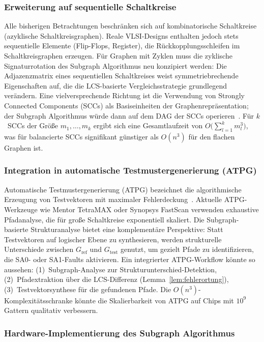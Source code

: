 ﻿\documentclass[a4paper,12pt]{article}
\theoremstyle{definition}
\begin{document}
\subsubsection{Erweiterung auf sequentielle Schaltkreise}

Alle bisherigen Betrachtungen beschränken sich auf kombinatorische
Schaltkreise (azyklische Schaltkreisgraphen). Reale VLSI-Designs
enthalten jedoch stets sequentielle Elemente (Flip-Flops, Register),
die Rückkopplungsschleifen im Schaltkreisgraphen erzeugen. Für
Graphen mit Zyklen muss die zyklische Signaturrotation des Subgraph
Algorithmus neu konzipiert werden: Die Adjazenzmatrix eines
sequentiellen Schaltkreises weist symmetriebrechende Eigenschaften
auf, die die LCS-basierte Vergleichsstrategie grundlegend verändern.
Eine vielversprechende Richtung ist die Verwendung von Strongly
Connected Components (SCCs) als Basiseinheiten der
Graphenrepräsentation; der Subgraph Algorithmus würde dann auf dem
DAG der SCCs operieren~\cite{cormen2009introduction}. Für $k$~SCCs
der Größe $m_1, \ldots, m_k$ ergibt sich eine Gesamtlaufzeit von
$O\!\bigl(\sum_{l=1}^k m_l^3\bigr)$, was für balancierte SCCs
signifikant günstiger als $O(n^3)$ für den flachen Graphen ist.

\subsubsection{Integration in automatische Testmustergenerierung (ATPG)}

Automatische Testmustergenerierung (ATPG) bezeichnet die
algorithmische Erzeugung von Testvektoren mit maximaler
Fehlerdeckung~\cite{bushnell2000essentials}. Aktuelle ATPG-Werkzeuge
wie Mentor TetraMAX oder Synopsys FastScan verwenden exhaustive
Pfadanalyse, die für große Schaltkreise exponentiell skaliert. Die
Subgraph-basierte Strukturanalyse bietet eine komplementäre
Perspektive: Statt Testvektoren auf logischer Ebene zu synthesieren,
werden strukturelle Unterschiede zwischen $G_{\mathrm{ref}}$ und
$G_{\mathrm{test}}$ genutzt, um gezielt Pfade zu identifizieren, die
SA0- oder SA1-Faults aktivieren. Ein integrierter ATPG-Workflow könnte
so aussehen: (1)~Subgraph-Analyse zur Strukturunterschied-Detektion,
(2)~Pfadextraktion über die LCS-Differenz (Lemma~\ref{lem:fehlerortung}),
(3)~Testvektorsynthese für die gefundenen Pfade.
Die $O(n^3)$-Komplexitäts\-schranke könnte die Skalierbarkeit von
ATPG auf Chips mit $10^9$ Gattern qualitativ verbessern.

\subsubsection{Hardware-Implementierung des Subgraph Algorithmus}
\end{document}
